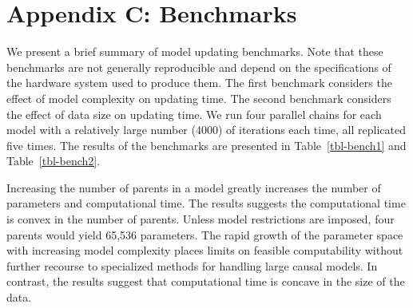 \documentclass[
  11pt,
  article]{jss}
\begin{document}
\newpage{}

\section*{Appendix C: Benchmarks}\label{sec-benchmark}

We present a brief summary of model updating benchmarks. Note that these
benchmarks are not generally reproducible and depend on the
specifications of the hardware system used to produce them. The first
benchmark considers the effect of model complexity on updating time. The
second benchmark considers the effect of data size on updating time. We
run four parallel chains for each model with a relatively large number
(4000) of iterations each time, all replicated five times. The results
of the benchmarks are presented in Table~\ref{tbl-bench1} and
Table~\ref{tbl-bench2}.

Increasing the number of parents in a model greatly increases the number
of parameters and computational time. The results suggests the
computational time is convex in the number of parents. Unless model
restrictions are imposed, four parents would yield 65,536 parameters.
The rapid growth of the parameter space with increasing model complexity
places limits on feasible computability without further recourse to
specialized methods for handling large causal models. In contrast, the
results suggest that computational time is concave in the size of the
data.

\newpage{}
\end{document}
